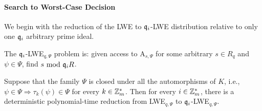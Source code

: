 \paragraph{Search to Worst-Case Decision}
We begin with the reduction of the LWE to $\mathfrak{q}_i$-LWE distribution relative to only one $\mathfrak{q}_i$ arbitrary prime ideal.
\begin{definition}
	The $\mathfrak{q}_i$-LWE$_{q,\Psi}$ problem is: given access to A$_{s,\Psi}$ for some arbitrary $s \in R_q$ and $\psi \in \Psi$, find $s \text{ mod } \mathfrak{q}_i R$.
\end{definition}
\begin{lemma}
	Suppose that the family $\Psi$ is closed under all the automorphisms of $K$, i.e., $\psi \in \Psi \Rightarrow \tau_k(\psi) \in \Psi$ for every $k \in \mathbb{Z}^*_m$. Then for every $i \in \mathbb{Z}^*_m$, there is a deterministic polynomial-time reduction from LWE$_{q, \Psi}$ to $\mathfrak{q}_i$-LWE$_{q, \Psi}$.
\end{lemma}

